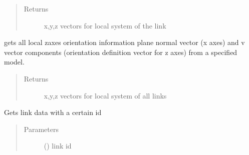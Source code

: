 \documentclass[letterpaper,10pt,english]{sphinxmanual}
\begin{document}
\begin{fulllineitems}
\begin{fulllineitems}
\begin{quote}
\begin{description}
\item[{Returns}] \leavevmode
x,y,z vectors for local system of the link

\end{description}\end{quote}

\end{fulllineitems}


\begin{fulllineitems}
\label{\detokenize{api:beamon.database.database.Database.get_link_orientations}}
gets all local z\sphinxhyphen{}axes orientation information \sphinxhyphen{} plane normal vector (x axes) and v vector components
(orientation definition vector for z axes) \sphinxhyphen{} from a specified model.
\begin{quote}\begin{description}
\item[{Returns}] \leavevmode
x,y,z vectors for local system of all links

\end{description}\end{quote}

\end{fulllineitems}


\begin{fulllineitems}
\label{\detokenize{api:beamon.database.database.Database.get_link_with_id}}
Gets link data with a certain id
\begin{quote}\begin{description}
\item[{Parameters}] \leavevmode
{} () \textendash{} link id


\end{description}
\end{quote}
\end{fulllineitems}
\end{fulllineitems}
\end{document}
